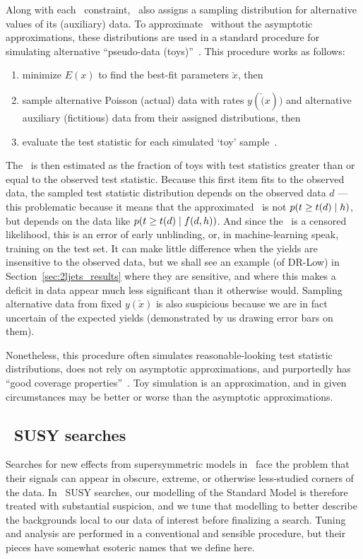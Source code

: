 Along with each \heplikelihood\ constraint, \histfactory\ also assigns a
sampling distribution for alternative values of its (auxiliary) data.
To approximate \pvalues\ without the asymptotic approximations,
these distributions are used in a standard procedure for simulating
alternative ``pseudo-data (toys)''~\cite{cern2011procedure}.
This procedure works as follows:
\begin{enumerate}
\item minimize $E(x)$ to find the best-fit parameters $\check{x}$, then
\item sample alternative Poisson (actual) data with rates $y(\check(x))$ and
alternative auxiliary (fictitious) data from their assigned distributions,
then
\item evaluate the test statistic for each simulated `toy'
sample~\cite{cern2011procedure}.
\end{enumerate}
The \pvalue\ is then estimated as the fraction of toys with test statistics
greater than or equal to the observed test statistic.
Because this first item fits to the observed data, the sampled test statistic
distribution depends on the observed data $d$ ---
this problematic because it means that the approximated \pvalue\ is not
$p(t \geq t(d) \mid h)$, but depends on the data like
$p(t \geq t(d) \mid f(d, h))$.
And since the \pvalue\ is a censored likelihood, this is an error of early
unblinding, or, in machine-learning speak, training on the test set.
It can make little difference when the yields are insensitive to the observed
data, but we shall see an example (of DR-Low) in
Section~\ref{sec:2ljets_results} where they are sensitive, and where
this makes a deficit in data appear much less significant than it  otherwise
would.
Sampling alternative data from fixed $y(\check{x})$ is also suspicious because
we are in fact uncertain of the expected yields
(demonstrated by us drawing error bars on them).

Nonetheless, this procedure often simulates reasonable-looking test statistic
distributions, does not rely on asymptotic approximations, and purportedly
has ``good coverage properties''~\cite{
cern2011procedure,
Cranmer2006Statistical
}.
Toy simulation is an approximation, and in given circumstances may be better or
worse than the asymptotic approximations.


\subsection{\atlas\ SUSY searches}
\label{sec:searches_searches}
Searches for new effects from supersymmetric models in \atlas\ face the problem
that their signals can appear in obscure, extreme, or otherwise less-studied
corners of the data.
In \atlas\ SUSY searches, our modelling of the  Standard Model is therefore
treated with substantial suspicion, and we tune that modelling to better
describe the backgrounds local to our data of interest before finalizing a
search.
Tuning and analysis are performed in a conventional and sensible procedure,
but their pieces have somewhat esoteric names that we define here.

